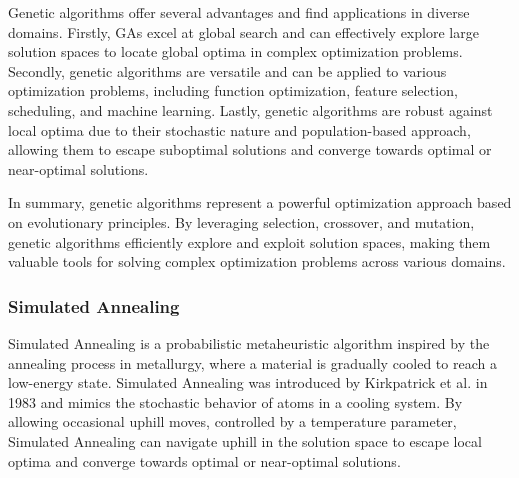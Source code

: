 \documentclass[11pt]{report}
\begin{document}
        Genetic algorithms offer several advantages and find applications in diverse domains. Firstly, GAs excel at global search and can effectively explore large solution spaces to locate global optima in complex optimization problems. Secondly, genetic algorithms are versatile and can be applied to various optimization problems, including function optimization, feature selection, scheduling, and machine learning. Lastly, genetic algorithms are robust against local optima due to their stochastic nature and population-based approach, allowing them to escape suboptimal solutions and converge towards optimal or near-optimal solutions.
        
        In summary, genetic algorithms represent a powerful optimization approach based on evolutionary principles. By leveraging selection, crossover, and mutation, genetic algorithms efficiently explore and exploit solution spaces, making them valuable tools for solving complex optimization problems across various domains.

        
        \subsubsection{Simulated Annealing}
        Simulated Annealing is a probabilistic metaheuristic algorithm inspired by the annealing process in metallurgy, where a material is gradually cooled to reach a low-energy state. Simulated Annealing was introduced by Kirkpatrick et al. in 1983 \cite{kirkpatrick1983optimization} and mimics the stochastic behavior of atoms in a cooling system. By allowing occasional uphill moves, controlled by a temperature parameter, Simulated Annealing can navigate uphill in the solution space to escape local optima and converge towards optimal or near-optimal solutions.
\end{document}
